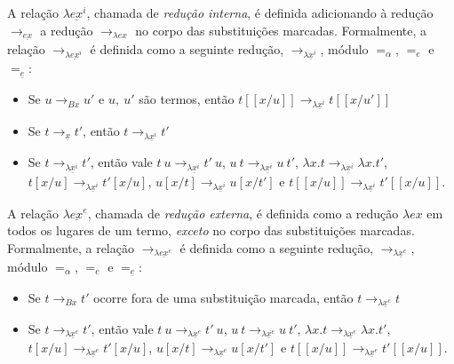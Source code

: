 \begin{definicao}
    A relação $\lambda \underline{ex}^i$, chamada de \emph{redução interna}, é
    definida adicionando à redução $\rightarrow_{\underline{ex}}$ a redução
    $\rightarrow_{\lambda ex}$ no corpo das substituições marcadas.
    Formalmente, a relação $\rightarrow_{\lambda \underline{ex}^i}$ é definida
    como a seguinte redução, $\rightarrow_{\lambda \underline{x}^i}$, módulo
    $=_{\alpha}$, $=_e$ e $=_{\underline{e}}$:

\begin{itemize}
    \item Se $u \rightarrow_{Bx} u'$ e $u,\ u'$ são termos, então $t[\![x/u]\!]
        \rightarrow_{\lambda \underline{x}^i} t[\![x/u']\!]$ 
    \item Se $t
        \rightarrow_{\underline{x}} t'$, então $t \rightarrow_{\lambda
            \underline{x}^i} t'$
    \item Se $t \rightarrow_{\lambda \underline{x}^i} t'$, então vale 
        $t\ u \rightarrow_{\lambda \underline{x}^i} t'\ u$,  
        $u\ t \rightarrow_{\lambda \underline{x}^i} u\ t'$, 
        $\lambda x. t \rightarrow_{\lambda \underline{x}^i} \lambda x. t'$, 
        $t[x/u] \rightarrow_{\lambda \underline{x}^i} t'[x/u]$, 
        $u[x/t] \rightarrow_{\lambda \underline{x}^i} u[x/t']$ e 
        $t[\![x/u]\!] \rightarrow_{\lambda \underline{x}^i} t'[\![x/u]\!]$.
\end{itemize}
\end{definicao}


\begin{definicao}
    A relação $\lambda \underline{ex}^e$, chamada de \emph{redução externa}, é
    definida como a redução $\lambda ex$ em todos os lugares de um termo,
    \emph{exceto} no corpo das substituições marcadas.  Formalmente, a relação
    $\rightarrow_{\lambda \underline{ex}^e}$ é definida como a seguinte redução,
    $\rightarrow_{\lambda \underline{x}^e}$, módulo $=_{\alpha}$, $=_e$ e
    $=_{\underline{e}}$:

\begin{itemize}
    \item Se $t \rightarrow_{Bx} t'$ ocorre fora de uma substituição marcada, então 
        $t \rightarrow_{\lambda \underline{x}^e} t$ 
    \item Se $t \rightarrow_{\lambda \underline{x}^e} t'$, então vale 
        $t\ u \rightarrow_{\lambda \underline{x}^e} t'\ u$,  
        $u\ t \rightarrow_{\lambda \underline{x}^e} u\ t'$, 
        $\lambda x. t \rightarrow_{\lambda \underline{x}^e} \lambda x. t'$, 
        $t[x/u] \rightarrow_{\lambda \underline{x}^e} t'[x/u]$, 
        $u[x/t] \rightarrow_{\lambda \underline{x}^e} u[x/t']$ e 
        $t[\![x/u]\!] \rightarrow_{\lambda \underline{x}^e} t'[\![x/u]\!]$.
\end{itemize}
\end{definicao}

